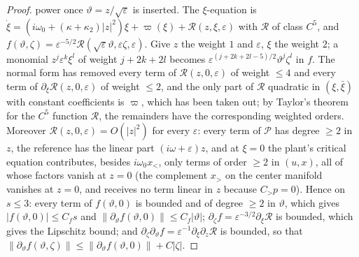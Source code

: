 \documentclass[11pt,reqno]{amsart}
\theoremstyle{plain}
\theoremstyle{definition}
\theoremstyle{remark}
\begin{document}
\begin{proof}
power once $\vartheta=z/\sqrt\varepsilon$ is inserted. The $\xi$-equation is $\dot\xi=(i\omega_0+(\kappa+\kappa_2)|z|^{2})\xi+\varpi(\xi)+\mathcal R(z,\xi,\varepsilon)$
with $\mathcal R$ of class $C^{5}$, and $f(\vartheta,\zeta)=\varepsilon^{-5/2}\mathcal R(\sqrt\varepsilon \vartheta,\varepsilon\zeta,\varepsilon)$. Give $z$ the weight $1$ and $\varepsilon$, $\xi$ the
weight $2$; a monomial $z^{j}\varepsilon^{k}\xi^{l}$ of weight $j+2k+2l$ becomes $\varepsilon^{(j+2k+2l-5)/2}\vartheta^{j}\zeta^{l}$ in $f$. The normal
form has removed every term of $\mathcal R(z,0,\varepsilon)$ of weight $\le4$ and every term of $\partial_\xi \mathcal R(z,0,\varepsilon)$ of weight $\le2$,
and the only part of $\mathcal R$ quadratic in $(\xi,\bar\xi)$ with constant coefficients is $\varpi$, which has been taken out; by Taylor's theorem for the
$C^{5}$ function $\mathcal R$, the remainders have the corresponding weighted orders. Moreover $\mathcal R(z,0,\varepsilon)=O(|z|^{2})$ for every $\varepsilon$: every term of $\mathcal P$ has degree $\ge2$ in $z$, the reference has
the linear part $(i\omega+\varepsilon)z$, and at $\xi=0$ the plant's critical equation contributes, besides $i\omega_0x_<$, only terms of order
$\ge2$ in $(u,x)$, all of whose factors vanish at $z=0$ (the complement $x_>$ on the center manifold vanishes at $z=0$, and
receives no term linear in $z$ because $C_>p=0$). Hence on $s\le3$: every term of $f(\vartheta,0)$ is bounded and of degree $\ge2$ in $\vartheta$, which gives
$|f(\vartheta,0)|\le C_fs$ and $\|\partial_\vartheta f(\vartheta,0)\|\le C_f|\vartheta|$; $\partial_\zeta f=\varepsilon^{-3/2}\partial_\xi\mathcal R$ is bounded, which gives the Lipschitz
bound; and $\partial_\zeta\partial_\vartheta f=\varepsilon^{-1}\partial_\xi\partial_z\mathcal R$ is bounded, so that
$\|\partial_\vartheta f(\vartheta,\zeta)\|\le\|\partial_\vartheta f(\vartheta,0)\|+C|\zeta|$.


\end{proof}
\end{document}
